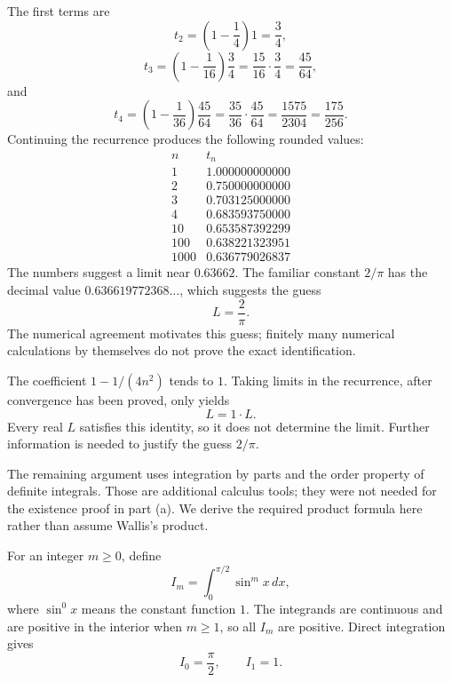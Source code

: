
The first terms are
\[
 t_2=\left(1-\frac14\right)1=\frac34,
\]
\[
 t_3=\left(1-\frac1{16}\right)\frac34
     =\frac{15}{16}\cdot\frac34=\frac{45}{64},
\]
and
\[
 t_4=\left(1-\frac1{36}\right)\frac{45}{64}
     =\frac{35}{36}\cdot\frac{45}{64}
     =\frac{1575}{2304}=\frac{175}{256}.
\]
Continuing the recurrence produces the following rounded values:
\[
 \begin{array}{c|c}
 n&t_n\\ \hline
 1&1.000000000000\\
 2&0.750000000000\\
 3&0.703125000000\\
 4&0.683593750000\\
 10&0.653587392299\\
 100&0.638221323951\\
 1000&0.636779026837
 \end{array}
\]
The numbers suggest a limit near $0.63662$.
The familiar constant $2/\pi$ has the decimal value
$0.636619772368\ldots$, which suggests the guess
\[
 L=\frac2\pi.
\]
The numerical agreement motivates this guess; finitely many numerical
calculations by themselves do not prove the exact identification.

The coefficient $1-1/(4n^2)$ tends to $1$.
Taking limits in the recurrence, after convergence has been proved,
only yields
\[
 L=1\cdot L.
\]
Every real $L$ satisfies this identity, so it does not determine the
limit. Further information is needed to justify the guess $2/\pi$.

The remaining argument uses integration by parts and the order
property of definite integrals. Those are additional calculus tools;
they were not needed for the existence proof in part (a).
We derive the required product formula here rather than assume
Wallis's product.

For an integer $m\ge0$, define
\[
 I_m=\int_0^{\pi/2}\sin^m x\,dx,
\]
where $\sin^0x$ means the constant function $1$.
The integrands are continuous and are positive in the interior
when $m\ge1$, so all $I_m$ are positive. Direct integration gives
\[
 I_0=\frac\pi2,\qquad I_1=1.
\]

